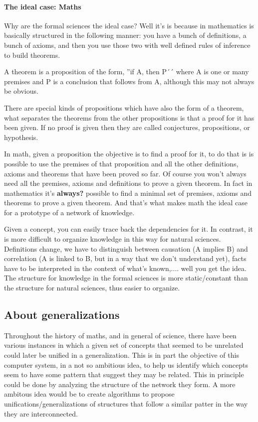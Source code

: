\paragraph{The ideal case: Maths}

Why are the formal sciences the ideal case? Well it's is because
in mathematics is basically structured in the following manner:
you have a bunch of definitions, a bunch of axioms, and then
you use those two with well defined rules of inference to build
theorems.

\indent
A theorem is a proposition of the form, ''if A, then P´´ where A is one
or many premises and P is a conclusion that follows from A, although
this may not always be obvious.

\indent
There are special kinds of propositions
which have also the form of a theorem, what separates the theorems from 
the other propositions is that a proof for it has been given.
If no proof is given then they are called conjectures, propositions, 
or hypothesis.

\indent
In math, given a proposition the objective is to find a proof for it, to do that
is is possible to use the premises of that proposition and all the 
other definitions, axioms and theorems that have been proved so far.
Of course you won't always need all the premises, axioms and definitions to 
prove a given theorem. In fact in mathematics it's \textbf{always?} 
possible to find a minimal set of premises, axioms and theorems 
to prove a given theorem. 
And that's what makes math the ideal case for a prototype of a network 
of knowledge.

\indent
Given a concept, you can easily trace back the dependencies for it.
In contrast, it is more difficult to organize knowledge in this way
for natural sciences. Definitions change, we have to distinguish 
between causation (A implies B) and correlation (A is linked to B, but 
in a way that we don't understand yet), facts have to be interpreted
in the context of what's known,.... well you get the idea. The 
structure for knowledge in the formal sciences is more static/constant
than the structure for natural sciences, thus easier to organize.


\subsection{About generalizations}
\indent
Throughout the history of maths, and in general of science, 
there have been various instances in which a given set of 
concepts that seemed to be unrelated could later be unified in 
a generalization. This is in part the objective of this
computer system, in a not so ambitious idea, to help us 
identify which concepts seem to have some pattern that suggest
they may be related. This in principle could be done by analyzing
the structure of the network they form.
A more ambitous idea would be to create algorithms to propose
unifications/generalizations of structures that follow a
similar patter in the way they are interconnected.
 
